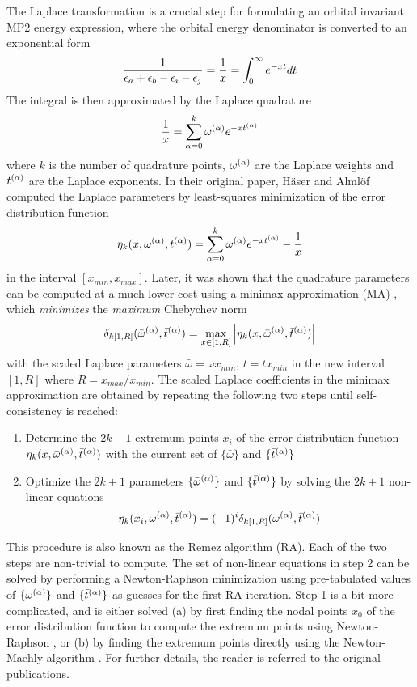The Laplace transformation is  a crucial step for formulating an orbital invariant MP2 energy expression, where the orbital energy denominator is converted to an exponential form 
\begin{equation}
\frac{1}{\epsilon_a + \epsilon_b - \epsilon_i - \epsilon_j } = \frac{1}{x} = \int_0^{\infty} e^{-xt} dt
\end{equation} 
\noindent The integral is then approximated by the Laplace quadrature
\begin{equation}
\frac{1}{x} = \sum_{\alpha = 0}^{k} \omega^{(\alpha)} e^{-xt^{(\alpha)}}  
\end{equation}
\noindent where $k$ is the number of quadrature points, $\omega^{(\alpha)}$ are the Laplace weights and $t^{(\alpha)}$ are the Laplace exponents. In their original paper, Häser and Almlöf \cite{Has1992} computed the Laplace parameters by least-squares minimization of the error distribution function
\begin{equation}
\eta_k (x,\omega^{(\alpha)},t^{(\alpha)}) = \sum_{\alpha = 0}^k \omega^{(\alpha)} e^{-xt^{(\alpha)}} - \frac{1}{x}
\end{equation}
\noindent in the interval $[x_{min},x_{max}]$. Later, it was shown that the quadrature parameters can be computed at a much lower cost using a minimax approximation (MA) \cite{Tak2008}, which \emph{minimizes} the \emph{maximum} Chebychev norm
\begin{equation}
\delta_{k[1,R]}(\bar{\omega}^{(\alpha)},\bar{t}^{(\alpha)}) = \max_{x \in [1,R]} \left\lvert \eta_k (x,\bar{\omega}^{(\alpha)},\bar{t}^{(\alpha)} ) \right\rvert 
\end{equation}
\noindent with the scaled Laplace parameters $\bar{\omega} = \omega x_{min}$, $\bar{t} = t x_{min}$  in the new interval $[1,R]$ where $R = x_{max}/x_{min}$. The scaled Laplace coefficients in the minimax approximation are obtained by repeating the following two steps until self-consistency is reached:
\begin{enumerate}
\item Determine the $2k-1$ extremum points $x_i$ of the error distribution function \\ 
$\eta_k (x,\bar{\omega}^{(\alpha)},\bar{t}^{(\alpha)})$ with the current set of $\{\bar{\omega}\}$ and $\{\bar{t}^{(\alpha)}\}$
\item Optimize the $2k+1$ parameters $\{\bar{\omega}^{(\alpha)}\}$ and $\{\bar{t}^{(\alpha)}\}$ by solving the $2k+1$ non-linear equations
\begin{equation}
\eta_k (x_i,\bar{\omega}^{(\alpha)},\bar{t}^{(\alpha)}) = (-1)^i \delta_{k[1,R]}(\bar{\omega}^{(\alpha)},\bar{t}^{(\alpha)})
\end{equation} 
\end{enumerate}
\noindent This procedure is also known as the Remez algorithm (RA). Each of the two steps are non-trivial to compute. The set of non-linear equations in step 2 can be solved by performing a Newton-Raphson minimization using pre-tabulated values of $\{\bar{\omega}^{(\alpha)}\}$ and $\{\bar{t}^{(\alpha)}\}$ as guesses for the first RA iteration. Step 1 is a bit more complicated, and is either solved (a) by first finding the nodal points $x_0$ of the error distribution function to compute the extremum points using Newton-Raphson \cite{Tak2008}, or (b) by finding the extremum points directly using the Newton-Maehly algorithm \cite{Hel2016}. For further details, the reader is referred to the original publications.

